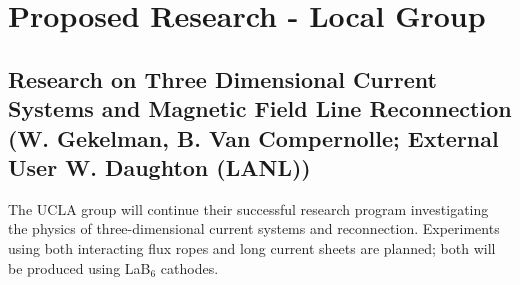 \documentclass[11pt]{article}
\begin{document}
\section{Proposed Research - Local Group}


\subsection{Research on Three Dimensional Current Systems and Magnetic Field
Line Reconnection (W. Gekelman, B. Van Compernolle; External User
W. Daughton (LANL))}

The UCLA group will continue their successful
research program investigating the physics of three-dimensional
current systems and reconnection.  Experiments using both interacting
flux ropes and long current sheets are planned; both will be produced
using LaB$_6$ cathodes.  
\end{document}
